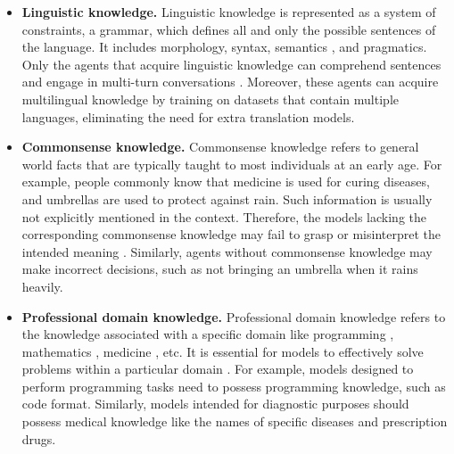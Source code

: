\begin{itemize}[leftmargin=*]
    \item \textbf{Linguistic knowledge.} Linguistic knowledge \cite{DBLP:conf/emnlp/VulicPLGK20, DBLP:conf/naacl/HewittM19,DBLP:journals/ipm/RauJZ89} is represented as a system of constraints, a grammar, which defines all and only the possible sentences of the language. It includes morphology, syntax, semantics \cite{DBLP:conf/dasfaa/YangCCHL16,DBLP:conf/emnlp/BeloucifB21}, and pragmatics. Only the agents that acquire linguistic knowledge can comprehend sentences and engage in multi-turn conversations \cite{DBLP:journals/corr/abs-2103-03125}. Moreover, these agents can acquire multilingual knowledge \cite{ DBLP:journals/corr/abs-2302-04023} by training on datasets that contain multiple languages, eliminating the need for extra translation models.
    \item \textbf{Commonsense knowledge.} 
    Commonsense knowledge \cite{DBLP:conf/emnlp/SafaviK21,DBLP:journals/tacl/JiangXAN20,DBLP:conf/emnlp/MadaanZ0YN22} refers to general world facts that are typically taught to most individuals at an early age. For example, people commonly know that medicine is used for curing diseases, and umbrellas are used to protect against rain. Such information is usually not explicitly mentioned in the context. Therefore, the models lacking the corresponding commonsense knowledge may fail to grasp or misinterpret the intended meaning \cite{DBLP:journals/sigmod/TandonVM17}. Similarly, agents without commonsense knowledge may make incorrect decisions, such as not bringing an umbrella when it rains heavily.
    \item \textbf{Professional domain knowledge.} 
    Professional domain knowledge refers to the knowledge associated with a specific domain like programming \cite{DBLP:conf/pldi/Xu0NH22,DBLP:conf/icml/Lai0WZZZYFWY23,DBLP:conf/emnlp/MadaanZ0YN22}, mathematics \cite{DBLP:journals/corr/abs-2110-14168}, medicine \cite{thirunavukarasu2023large}, etc. It is essential for models to effectively solve problems within a particular domain \cite{DBLP:conf/acl/GururanganMSLBD20}. For example, models designed to perform programming tasks need to possess programming knowledge, such as code format. Similarly, models intended for diagnostic purposes should possess medical knowledge like the names of specific diseases and prescription drugs.
\end{itemize}

